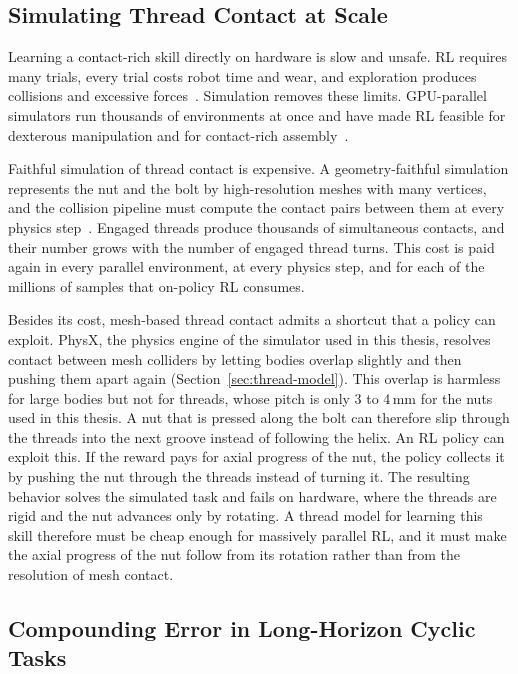 \subsection{Simulating Thread Contact at Scale}\label{sec:difficulty-contact}

Learning a contact-rich skill directly on hardware is slow and unsafe. \Ac{RL} requires many trials, every trial costs robot time and wear, and exploration produces collisions and excessive forces~\cite{Kober2013}. Simulation removes these limits. GPU-parallel simulators run thousands of environments at once and have made \ac{RL} feasible for dexterous manipulation and for contact-rich assembly~\cite{Handa2024,Petrenko2023,Narang2022}.

Faithful simulation of thread contact is expensive. A geometry-faithful simulation represents the nut and the bolt by high-resolution meshes with many vertices, and the collision pipeline must compute the contact pairs between them at every physics step~\cite{Narang2022}. Engaged threads produce thousands of simultaneous contacts, and their number grows with the number of engaged thread turns. This cost is paid again in every parallel environment, at every physics step, and for each of the millions of samples that on-policy \ac{RL} consumes.

Besides its cost, mesh-based thread contact admits a shortcut that a policy can exploit. PhysX, the physics engine of the simulator used in this thesis, resolves contact between mesh colliders by letting bodies overlap slightly and then pushing them apart again (Section~\ref{sec:thread-model}). This overlap is harmless for large bodies but not for threads, whose pitch is only 3 to 4\,mm for the nuts used in this thesis. A nut that is pressed along the bolt can therefore slip through the threads into the next groove instead of following the helix. An \ac{RL} policy can exploit this. If the reward pays for axial progress of the nut, the policy collects it by pushing the nut through the threads instead of turning it. The resulting behavior solves the simulated task and fails on hardware, where the threads are rigid and the nut advances only by rotating. A thread model for learning this skill therefore must be cheap enough for massively parallel \ac{RL}, and it must make the axial progress of the nut follow from its rotation rather than from the resolution of mesh contact.

\subsection{Compounding Error in Long-Horizon Cyclic Tasks}\label{sec:difficulty-horizon}

